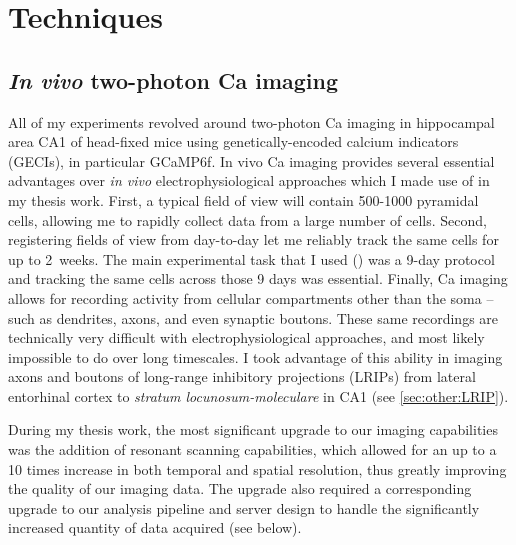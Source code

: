 \acresetall
\chapter{Techniques}
\label{ch:intro:techniques}

\section{\emph{In vivo} two-photon Ca imaging}
All of my experiments revolved around two-photon Ca imaging in hippocampal area CA1 of head-fixed mice using genetically-encoded calcium indicators (GECIs), in particular GCaMP6f.
In vivo Ca imaging provides several essential advantages over \emph{in vivo} electrophysiological approaches which I made use of in my thesis work.
First, a typical field of view will contain 500-1000 pyramidal cells, allowing me to rapidly collect data from a large number of cells.
Second, registering fields of view from day-to-day let me reliably track the same cells for up to 2~weeks. The main experimental task that I used () was a 9-day protocol and tracking the same cells across those 9 days was essential.
Finally, Ca imaging allows for recording activity from cellular compartments other than the soma -- such as dendrites, axons, and even synaptic boutons.
These same recordings are technically very difficult with electrophysiological approaches, and most likely impossible to do over long timescales.
I took advantage of this ability in imaging axons and boutons of long-range inhibitory projections (LRIPs) from lateral entorhinal cortex to \emph{stratum locunosum-moleculare} in CA1 (see \autoref{sec:other:LRIP}).

During my thesis work, the most significant upgrade to our imaging capabilities was the addition of resonant scanning capabilities, which allowed for an up to a 10 times increase in both temporal and spatial resolution, thus greatly improving the quality of our imaging data.
The upgrade also required a corresponding upgrade to our analysis pipeline and server design to handle the significantly increased quantity of data acquired (see below).

